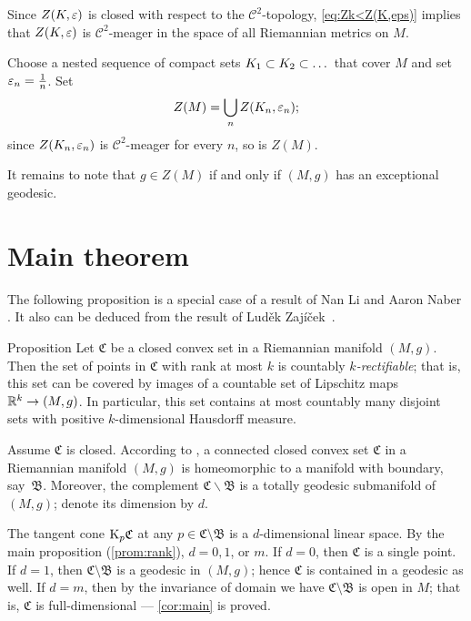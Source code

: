 \documentclass[a4paper,10pt]{article}
\begin{document}
Since $Z(K,\varepsilon)$ is closed with respect to the $\mathcal C^2$-topology, \ref{eq:Zk<Z(K,eps)} implies that $Z(K,\varepsilon)$ is $\mathcal{C}^2$-meager in the space of all Riemannian metrics on $M$.


Choose a nested sequence of compact sets $K_1\z\subset K_2\subset \dots$ that cover $M$ and set $\varepsilon_n=\tfrac1n$.
Set 
\[Z(M)=\bigcup_n Z(K_n,\varepsilon_n);\]
since $Z(K_n,\varepsilon_n)$ is $\mathcal{C}^2$-meager for every $n$, so is $Z(M)$.

It remains to note that $g\in Z(M)$ if and only if $(M,g)$ has an exceptional geodesic.
\qeds


\section{Main theorem}

The following proposition is a special case of a result of Nan Li and Aaron Naber \cite[Theorem 1.6]{li-naber}.
It also can be deduced from the result of Luděk 
Zajíček~\cite{zajicek}.

\begin{thm}{Proposition}\label{prop:rectifiable}
Let $\mathfrak{C}$ be a closed convex set in a Riemannian manifold $(M,g)$.
Then the set of points in $\mathfrak{C}$ with rank at most $k$ is countably \emph{$k$-rectifiable};
that is, this set can be  covered by images of a countable set of Lipschitz maps $\mathbb{R}^k\to (M,g)$.
In particular, this set contains at most countably many disjoint sets with positive $k$-dimensional Hausdorff measure.
\end{thm}

Assume $\mathfrak{C}$ is closed.
According to \cite[Theorem 1.6]{cheeger-gromoll}, a connected closed convex set $\mathfrak{C}$ in a Riemannian manifold $(M,g)$ is homeomorphic to a manifold with boundary, say~$\mathfrak{B}$.
Moreover, the complement $\mathfrak{C}\backslash \mathfrak{B}$ is a totally geodesic submanifold of $(M,g)$; denote its dimension by $d$.

The tangent cone $\mathrm{K}_p \mathfrak C$ at any $p \in \mathfrak C\setminus \mathfrak B$ is a $d$-dimensional linear space.
By the main proposition (\ref{prom:rank}), $d=0, 1$, or $m$.
If $d=0$, then $\mathfrak{C}$ is a single point.
If $d=1$, then $\mathfrak C\setminus \mathfrak B$ is a  geodesic in $(M,g)$;
hence $\mathfrak C$ is contained in a  geodesic as well.
If $d=m$, then by the invariance of domain we have  $\mathfrak C\setminus \mathfrak B$ is open in $M$; that is, $\mathfrak C$ is full-dimensional --- \ref{cor:main} is proved.
\end{document}
